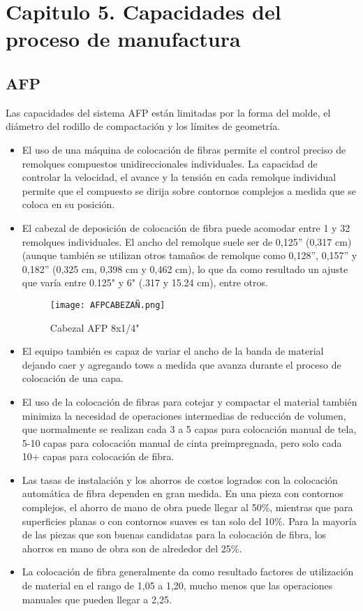 \chapter{Capitulo 5. Capacidades del proceso de manufactura}
\label{Punto 5. Capacidades}
\section{AFP}

Las capacidades del sistema AFP están limitadas por la forma del molde, el diámetro del rodillo de compactación y los límites de geometría.  
 \begin{itemize}
     \item El uso de una máquina de colocación de fibras permite el control preciso de remolques compuestos unidireccionales individuales. La capacidad de controlar la velocidad, el avance y la tensión en cada remolque individual permite que el compuesto se dirija sobre contornos complejos a medida que se coloca en su posición.
     \item El cabezal de deposición de colocación de fibra puede acomodar entre 1 y 32 remolques individuales. El ancho del remolque suele ser de 0,125” (0,317 cm) (aunque también se utilizan otros tamaños de remolque como 0,128”, 0,157” y 0,182” (0,325 cm, 0,398 cm y 0,462 cm), lo que da como resultado un ajuste que varía entre 0.125" y 6" (.317 y 15.24 cm), entre otros.
\begin{figure}[H]
    \centering
    \texttt{[image: AFPCABEZAÑ.png]}
    \caption{Cabezal AFP 8x1/4"}
    \label{fig:enter-label}
\end{figure}
     \item El equipo también es capaz de variar el ancho de la banda de material dejando caer y agregando tows a medida que avanza durante el proceso de colocación de una capa.
     \item El uso de la colocación de fibras para cotejar y compactar el material también minimiza la necesidad de operaciones intermedias de reducción de volumen, que normalmente se realizan cada 3 a 5 capas para colocación manual de tela, 5-10 capas para colocación manual de cinta preimpregnada, pero solo cada 10+ capas para colocación de fibra.
     \item Las tasas de instalación y los ahorros de costos logrados con la colocación automática de fibra dependen en gran medida. En una pieza con contornos complejos, el ahorro de mano de obra puede llegar al 50\%, mientras que para superficies planas o con contornos suaves es tan solo del 10\%. Para la mayoría de las piezas que son buenas candidatas para la colocación de fibra, los ahorros en mano de obra son de alrededor del 25\%.
     \item La colocación de fibra generalmente da como resultado factores de utilización de material en el rango de 1,05 a 1,20, mucho menos que las operaciones manuales que pueden llegar a 2,25. 
 \end{itemize}
